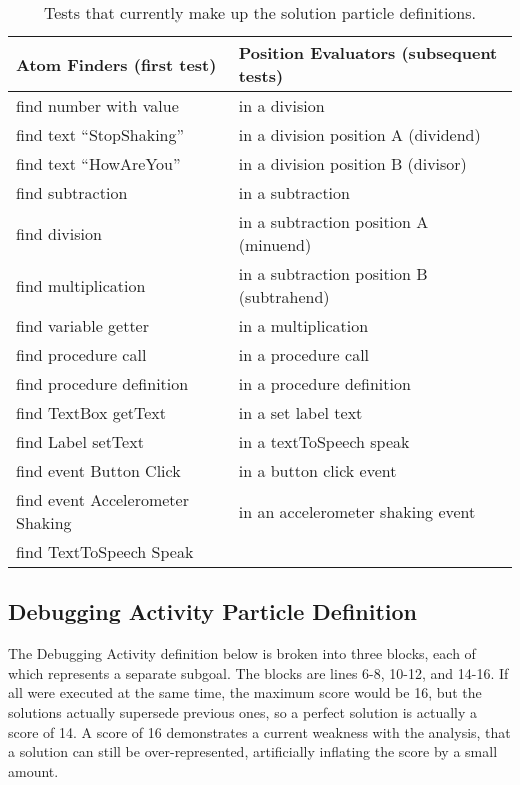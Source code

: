 \begin{table}
\begin{centering}
    \begin{tabular}{l l}
        Atom Finders (first test)           & Position Evaluators (subsequent tests) \\ \hline
        find number with value              & in a division \\
        find text ``StopShaking''           & in a division position A  (dividend)  \\
        find text ``HowAreYou''             & in a division position B  (divisor)   \\
        find subtraction                    & in a subtraction  \\
        find division                       & in a subtraction position A (minuend) \\
        find multiplication                 & in a subtraction position B (subtrahend)  \\
        find variable getter                & in a multiplication   \\
        find procedure call                 & in a procedure call   \\
        find procedure definition           & in a procedure definition \\
        find TextBox getText                & in a set label text   \\
        find Label setText                  & in a textToSpeech speak   \\
        find event Button Click             & in a button click event   \\
        find event Accelerometer Shaking    & in an accelerometer shaking event     \\
        find TextToSpeech Speak             &   \\

    \end{tabular}
    \caption[Particle Solution Tests]{Tests that currently make up the solution particle definitions.}
    \label{tab:particle-tests-available}
\end{centering}
\end{table}

\subsection{Debugging Activity Particle Definition}
The Debugging Activity definition below %
is broken into three blocks, each of which represents a separate subgoal. The blocks are lines 6-8, 10-12, and 14-16. If all were executed at the same time, the maximum score would be 16, but the solutions actually supersede previous ones, so a perfect solution is actually a score of 14. A score of 16 demonstrates a current weakness with the analysis, that a solution can still be over-represented, artificially inflating the score by a small amount.

